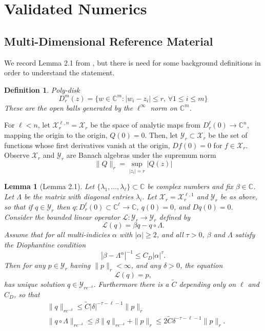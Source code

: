 \documentclass{article}
\newcommand{\C}{\mathbb{C}}
\newcommand{\X}{\mathcal{X}}
\newcommand{\Y}{\mathcal{Y}}
\theoremstyle{plain}
\newtheorem{lemma}{Lemma}
\newtheorem*{dfn}{Definition}
\theoremstyle{remark}
\begin{document}
\section{Validated Numerics}

\subsection{Multi-Dimensional Reference Material}

We record Lemma 2.1 from \cite{parampaper}, but there is need for some background definitions in order to understand the statement. 

\begin{dfn}{Poly-disk}
\[
D^m_r(z) = \{ w \in \C^m : |w_i - z_i| \leq r, \, \forall 1 \leq i \leq m\}
\]
These are the open balls generated by the $\ell^\infty$ norm on $\C^m$.
\end{dfn}


For $\ell < n$, let $\X^{\ell,n}_r = \X_r$ be the space of analytic maps from $D_r^\ell(0) \to \C^n$, mapping the origin to the origin, $Q(0) = 0$.
Then, let $\Y_r \subset \X_r$ be the set of functions whose first derivatives vanish at the origin, $Df(0) = 0$ for $f \in \X_r$. 
Observe $\X_r$ and $\Y_r$ are Banach algebras under the supremum norm
\[ 
\| Q \|_r = \sup_{|z_i| = r} |Q(z)|
\]

\begin{lemma}[Lemma 2.1]
Let $\{\lambda_1,\dots,\lambda_\ell\} \subset \C$ be complex numbers and fix $\beta \in \C$. 
Let $\Lambda$ be the matrix with diagonal entries $\lambda_i$. 
Let $\mathcal{X}_r = \mathcal{X}^{\ell,1}_r$ and $\mathcal{Y}_r$ be as above, so that if $q \in \mathcal{Y}_r$ then $q : D^\ell_r(0) \subset \C^\ell \to \C$, $q(0) = 0$, and $Dq(0) = 0$. 
Consider the bounded linear operator $\mathcal{L} : \mathcal{Y}_r \to \mathcal{Y}_r$ defined by
\begin{equation}
\label{dfnL}
\mathcal{L}(q) = \beta q - q \circ \Lambda.
\end{equation}
Assume that for all multi-indicies $\alpha$ with $|\alpha| \geq 2$, and all $\tau > 0$, $\beta$ and $\Lambda$ satisfy the Diophantine condition
\begin{equation}
|\beta - \Lambda^\alpha|^{-1} \leq C_D|\alpha|^\tau.
\end{equation}
Then for any $p \in \mathcal{Y}_r$ having $\|p\|_r < \infty$, and any $\delta > 0$, the equation
\begin{equation}
\label{lqp}
\mathcal{L}(q) = p,
\end{equation}
has unique solution $q \in \mathcal{Y}_{re^{-\delta}}$. 
Furthermore there is a $\tilde{C}$ depending only on $\ell$ and $C_D$, so that
\begin{equation}
\begin{aligned}
&\|q\|_{re^{-\delta}} \leq \tilde{C}|\delta|^{-\tau-\ell-1}\|p\|_r \\
&\|q \circ \Lambda\|_{re^{-\delta}} \leq \beta \|q \|_{re^{-\delta}} + \|p\|_r \leq 2 \tilde{C}\delta^{-\tau-\ell-1}\|p\|_r.
\end{aligned}
\end{equation}
\end{lemma}
\end{document}

